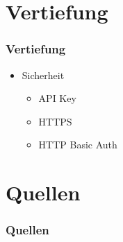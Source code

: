\section{Vertiefung}
\begin{frame}
	\frametitle*{Vertiefung}
	\begin{itemize}
		\item Sicherheit
			\begin{itemize}
				\item API Key
				\item HTTPS
				\item HTTP Basic Auth
			\end{itemize}
	\end{itemize}
\end{frame}

\section{Quellen}
\begin{frame}
	\frametitle*{Quellen}
\end{frame}

